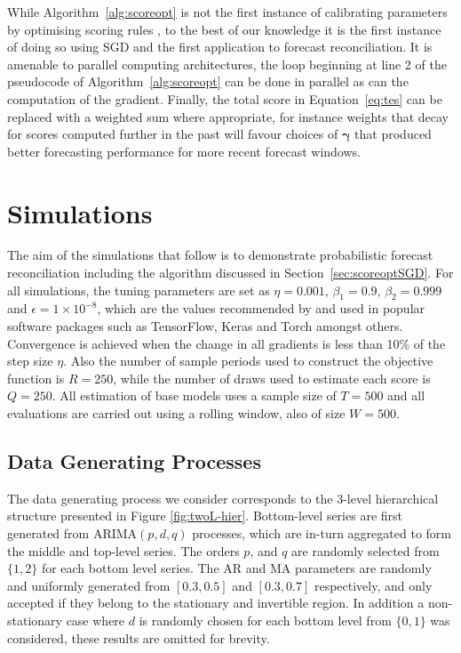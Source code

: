 \documentclass[12pt]{article}
\theoremstyle{definition}
\begin{document}
While Algorithm~\ref{alg:scoreopt} is not the first instance of calibrating parameters by optimising scoring rules \citep[see][for an example]{gneiting2005}, to the best of our knowledge it is the first instance of doing so using SGD and the first application to forecast reconciliation.  It is amenable to parallel computing architectures, the loop beginning at line 2 of the pseudocode of Algorithm~\ref{alg:scoreopt} can be done in parallel as can the computation of the gradient.  Finally, the total score in Equation~\ref{eq:tes} can be replaced with a weighted sum where appropriate, for instance weights that decay for scores computed further in the past will favour choices of $\bm{\gamma}$ that produced better forecasting performance for more recent forecast windows.

\section{Simulations}\label{sec:simulations}

The aim of the simulations that follow is to demonstrate probabilistic forecast reconciliation including the algorithm discussed in Section~\ref{sec:scoreoptSGD}.  For all simulations, the tuning parameters are set as $\eta=0.001$, $\beta_1=0.9$, $\beta_2=0.999$ and $\epsilon=1\times 10^{-8}$, which are the values recommended by \cite{kingma2014} and used in popular software packages such as TensorFlow, Keras and Torch amongst others.  Convergence is achieved when the change in all gradients is less than 10\% of the step size $\eta$.  Also the number of sample periods used to construct the objective function is $R=250$, while the number of draws used to estimate each score is $Q=250$.  All estimation of base models uses a sample size of $T=500$ and all evaluations are carried out using a rolling window, also of size $W=500$.  

\subsection{Data Generating Processes}\label{sec:dgp}

The data generating process we consider corresponds to the 3-level hierarchical structure presented in Figure \ref{fig:twoL-hier}. Bottom-level series are first generated from ARIMA$(p,d,q)$ processes, which are in-turn aggregated to form the middle and top-level series. The orders $p$, and $q$ are randomly selected from $\{1,2\}$ for each bottom level series. The AR and MA parameters are randomly and uniformly generated from $[0.3,0.5]$ and $[0.3,0.7]$ respectively, and only accepted if they belong to the stationary and invertible region.  In addition a non-stationary case where $d$ is randomly chosen for each bottom level from $\{0,1\}$ was considered, these results are omitted for brevity.
\end{document}
